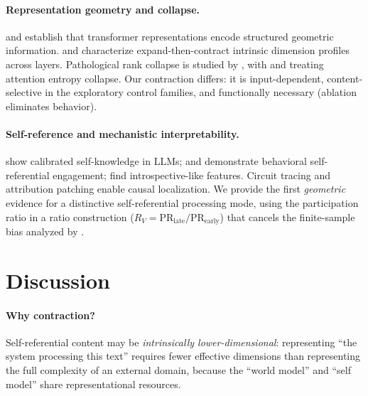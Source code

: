 \documentclass{article}
\newcommand{\RV}{R_V}
\newcommand{\PR}{\text{PR}}
\begin{document}
\paragraph{Representation geometry and collapse.}
\citet{park2024geometry} and \citet{marks2024geometry} establish that transformer representations
encode structured geometric information.
\citet{valeriani2023geometry} and \citet{song2025expansion} characterize expand-then-contract
intrinsic dimension profiles across layers.
Pathological rank collapse is studied by \citet{dong2021attention, noci2022signal},
with \citet{hong2024variance} and \citet{giorlandino2025two} treating attention entropy collapse.
Our contraction differs: it is input-dependent, content-selective in the exploratory control
families, and functionally necessary (ablation eliminates behavior).

\paragraph{Self-reference and mechanistic interpretability.}
\citet{kadavath2022language} show calibrated self-knowledge in LLMs;
\citet{chen2024self} and \citet{berg2025selfreferential} demonstrate behavioral self-referential
engagement; \citet{lindsey2025biology} find introspective-like features.
Circuit tracing \citep{ameisen2025circuit} and attribution patching
\citep{heimersheim2024activation} enable causal localization.
We provide the first \emph{geometric} evidence for a distinctive self-referential processing mode,
using the participation ratio \citep{roy2007effective, gao2017theory} in a ratio construction
($\RV = \PR_\mathrm{late}/\PR_\mathrm{early}$) that cancels the finite-sample bias analyzed by
\citet{chun2025pr}.


\section{Discussion}
\label{sec:discussion}

\paragraph{Why contraction?}
Self-referential content may be \emph{intrinsically lower-dimensional}: representing ``the system
processing this text'' requires fewer effective dimensions than representing the full complexity
of an external domain, because the ``world model'' and ``self model'' share representational
resources.
\end{document}
